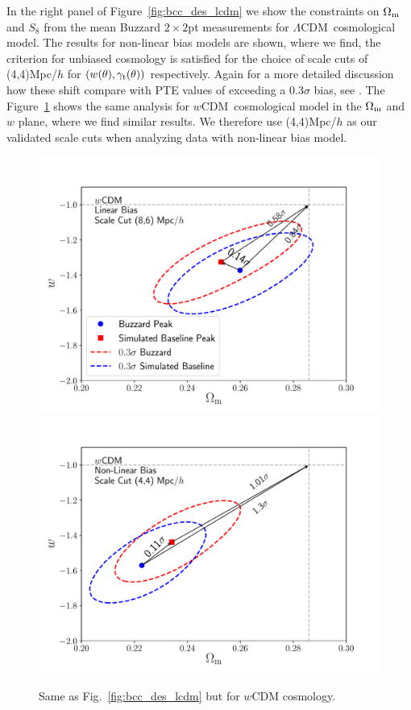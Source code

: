 \documentclass[aps, prd,twocolumn,superscriptaddress,nofootinbib,preprintnumbers]{revtex4-1}
\newcommand{\lcdm}{$\Lambda$CDM}
\newcommand{\wcdm}{$w$CDM}
\newcommand\fig[1]{Figure~\ref{#1}}
\begin{document}
In the right panel of \fig{fig:bcc_des_lcdm} we show the constraints on $\Omega_{\rm m}$ and $S_8$ from the mean Buzzard $2\times2$pt measurements for \lcdm\ cosmological model. The results for non-linear bias models are shown, where we find, the criterion for unbiased cosmology is satisfied for the choice of scale cuts of (4,4)Mpc/$h$ for $(w(\theta),\gamma_{\rm t}(\theta))$ respectively. Again for a more detailed discussion how these shift compare with PTE values of exceeding a $0.3\sigma$ bias, see \citet*{y3-simvalidation}. The \fig{fig:bcc_des_wcdm} shows the same analysis for \wcdm\ cosmological model in the $\Omega_{\rm m}$ and $w$ plane, where we find similar results. We therefore use (4,4)Mpc/$h$ as our validated scale cuts when analyzing data with non-linear bias model. 

\begin{figure}
\includegraphics[width=\columnwidth]{figs/Buzzard_linbias86_2x2pt_wcdm.pdf}
\includegraphics[width=\columnwidth]{figs/Buzzard_nlbias44_2x2pt_wcdm.pdf}
\caption[]{Same as Fig.~\ref{fig:bcc_des_lcdm} but for $w$CDM cosmology.
}
\label{fig:bcc_des_wcdm}
\end{figure}
\end{document}
